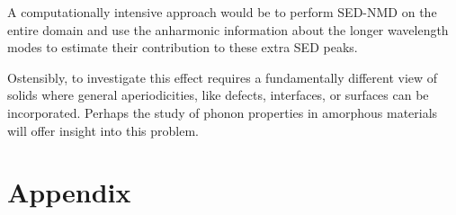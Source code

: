 \documentclass[aps,prb,preprint,preprintnumbers,amsmath,amssymb,floatfix,superscriptaddress]{revtex4}
\begin{document}
A computationally intensive approach would be to perform SED-NMD on the entire domain and use the anharmonic information about the longer wavelength modes to estimate their contribution to these extra SED peaks.

Ostensibly, to investigate this effect requires a fundamentally different view of solids where general aperiodicities, like defects, interfaces, or surfaces can be incorporated. Perhaps the study of phonon properties in amorphous materials will offer insight into this problem.


\newpage
%


\newpage

\section*{Appendix}
\end{document}
